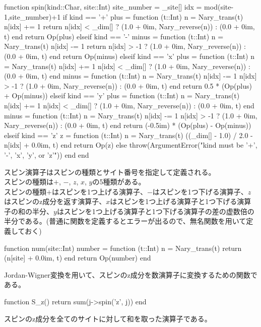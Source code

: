 \documentclass{ltjsarticle}
\begin{document}
\begin{jllisting}
function spin(kind::Char, site::Int)
  site_number = _site[]
  idx = mod(site-1,site_number)+1
  if kind == '+'
    plus = function (t::Int)
      n = Nary_trans(t)
      n[idx] += 1
      return n[idx] < _dim[] ? (1.0 + 0im, Nary_reverse(n)) : (0.0 + 0im, t)
    end
    return Op(plus)
  elseif kind == '-'
    minus = function (t::Int)
      n = Nary_trans(t)
      n[idx] -= 1
      return n[idx] > -1 ? (1.0 + 0im, Nary_reverse(n)) : (0.0 + 0im, t)
    end
    return Op(minus)
  elseif kind == 'x'
    plus = function (t::Int)
      n = Nary_trans(t)
      n[idx] += 1
      n[idx] < _dim[] ? (1.0 + 0im, Nary_reverse(n)) : (0.0 + 0im, t)
    end
    minus = function (t::Int)
      n = Nary_trans(t)
      n[idx] -= 1
      n[idx] > -1 ? (1.0 + 0im, Nary_reverse(n)) : (0.0 + 0im, t)
    end
    return 0.5 * (Op(plus) + Op(minus))
  elseif kind == 'y'
    plus = function (t::Int)
      n = Nary_trans(t)
      n[idx] += 1
      n[idx] < _dim[] ? (1.0 + 0im, Nary_reverse(n)) : (0.0 + 0im, t)
    end
    minus = function (t::Int)
      n = Nary_trans(t)
      n[idx] -= 1
      n[idx] > -1 ? (1.0 + 0im, Nary_reverse(n)) : (0.0 + 0im, t)
    end
    return (-0.5im) * (Op(plus) - Op(minus))
  elseif kind == 'z'
    z = function (t::Int)
      n = Nary_trans(t)
      ((_dim[] - 1.0) / 2.0 - n[idx] + 0.0im, t)
    end
    return Op(z)
  else
    throw(ArgumentError("kind must be '+', '-', 'x', 'y', or 'z'"))
  end
end
\end{jllisting}
スピン演算子はスピンの種類とサイト番号を指定して定義される。\\
スピンの種類は$+$, $-$, $z$, $x$, $y$の5種類がある。\\
スピンの種類$+$はスピンを1つ上げる演算子、$-$はスピンを1つ下げる演算子、$z$はスピンのz成分を返す演算子、$x$はスピンを1つ上げる演算子と1つ下げる演算子の和の半分、$y$はスピンを1つ上げる演算子と1つ下げる演算子の差の虚数倍の半分である。(普通に関数を定義するとエラーが出るので、無名関数を用いて定義しておく)\\
\begin{jllisting}
function num(site::Int)
  number = function (t::Int)
    n = Nary_trans(t)
    return (n[site] + 0.0im, t)
  end
  return Op(number)
end
\end{jllisting}
Jordan-Wigner変換を用いて、スピンのz成分を数演算子に変換するための関数である。\\
\begin{jllisting}
function S_z()
  return sum(j->spin('z', j))
end
\end{jllisting}
スピンのz成分を全てのサイトに対して和を取った演算子である。\\
\end{document}
